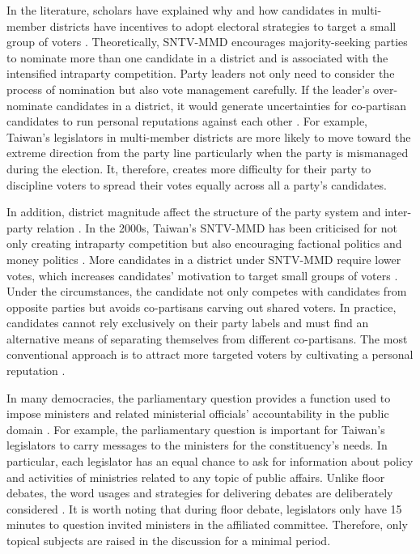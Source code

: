 In the literature, scholars have explained why and how candidates in multi-member districts have incentives to adopt electoral strategies to target a small group of voters \citep{Cox1990, Downs1957, Myerson1993}. Theoretically, SNTV-MMD encourages majority-seeking parties to nominate more than one candidate in a district \citep{Shugart2003} and is associated with the intensified intraparty competition. Party leaders not only need to consider the process of nomination but also vote management carefully. If the leader's over-nominate candidates in a district, it would generate uncertainties for co-partisan candidates to run personal reputations against each other \citep{Shugart2003, Cox1990}. For example, Taiwan's legislators in multi-member districts are more likely to move toward the extreme direction from the party line particularly when the party is mismanaged during the election\citep{Jang2019}. It, therefore, creates more difficulty for their party to discipline voters to spread their votes equally across all a party's candidates. 

In addition, district magnitude affect the structure of the party system and inter-party relation \citep{Duverger1954}. In the 2000s, Taiwan's SNTV-MMD has been criticised for not only creating intraparty competition \citep[e.g.,][]{Hirano2006}  but also encouraging factional politics and money politics \citep{Cox1996, Cox1994, Batto2016, Wu2003, Richardson1988}. More candidates in a district under SNTV-MMD require lower votes, which increases candidates' motivation to target small groups of voters \citep{Downs1957, Myerson1993}. Under the circumstances, the candidate not only competes with candidates from opposite parties but avoids co-partisans carving out shared voters. In practice, candidates cannot rely exclusively on their party labels and must find an alternative means of separating themselves from different co-partisans. The most conventional approach is to attract more targeted voters by cultivating a personal reputation \citep{Cain1987, Reed1994}.

In many democracies, the parliamentary question provides a function used to impose ministers and related ministerial officials' accountability in the public domain \citep{Martin2017}. For example, the parliamentary question is important for Taiwan's legislators to carry messages to the ministers for the constituency's needs. In particular, each legislator has an equal chance to ask for information about policy and activities of ministries related to any topic of public affairs. Unlike floor debates, the word usages and strategies for delivering debates are deliberately considered \citep[][]{Slapin2014, Slapin2018}. It is worth noting that during floor debate, legislators only have 15 minutes to question invited ministers in the affiliated committee. Therefore, only topical subjects are raised in the discussion for a minimal period. 

